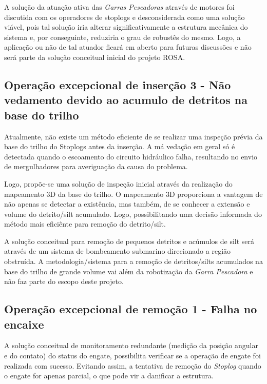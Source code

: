 A solução da atuação ativa das \emph{Garras Pescadoras} através de motores foi discutida com os operadores de stoplogs e desconsiderada como uma solução viável, pois tal solução iria alterar significativamente a estrutura mecânica do sistema e, por conseguinte, reduziria o grau de robustês do mesmo. Logo, a aplicação ou não de tal atuador ficará em aberto para futuras discussões e não será parte da solução conceitual inicial do projeto ROSA. 




\subsection{Operação excepcional de inserção 3 - Não vedamento devido ao acumulo de detritos na base do trilho}

Atualmente, não existe um método eficiente de se realizar uma inspeção prévia da base do trilho do Stoplogs antes da inserção. A má vedação em geral só é detectada quando o escoamento do circuito hidráulico falha, resultando no envio de mergulhadores para averiguação da causa do problema. 

Logo, propõe-se uma solução de inspeção inicial através da realização do mapeamento 3D da base do trilho.
O mapeamento 3D proporciona a vantagem de não apenas se detectar a existência, mas também, de se conhecer a extensão e volume do detrito/silt acumulado. Logo, possibilitando uma decisão informada do método mais eficiênte para remoção do detrito/silt. 

A solução conceitual para remoção de pequenos detritos e acúmulos de silt será através de um sistema de bombeamento submarino direcionado a região obstruída. A metodologia/sistema para a remoção de detritos/silts acumulados na base do trilho de grande volume vai além da robotização da \emph{Garra Pescadora} e não faz parte do escopo deste projeto.



\subsection{Operação excepcional de remoção 1 - Falha no encaixe}

A solução conceitual de monitoramento redundante (medição da posição angular e do contato) do status do engate, possibilita verificar se a operação de engate foi realizada com sucesso. Evitando assim, a tentativa de remoção do \emph{Stoplog} quando o engate for apenas parcial, o que pode vir a danificar a estrutura. 

